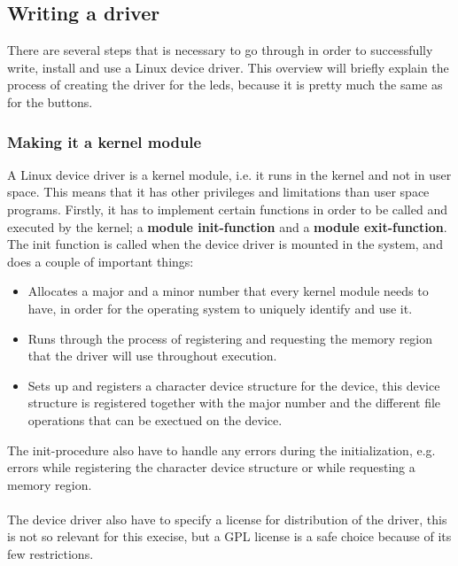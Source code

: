 \subsection{Writing a driver}
There are several steps that is necessary to go through in order
to successfully write, install and use a Linux device driver. This
overview will briefly explain the process of creating the driver
for the leds, because it is pretty much the same as for the buttons.

\subsubsection{Making it a kernel module}
A Linux device driver is a kernel module, i.e. it runs in the kernel and
not in user space. This means that it has other privileges and
limitations than user space programs. Firstly, it has to implement
certain functions in order to be called and executed by the kernel;
a \textbf{module init-function} and a \textbf{module exit-function}.
The init function is called when the device driver is mounted in the
system, and does a couple of important things:

\begin{itemize}
	\item	Allocates a major and a minor number that every
			kernel module needs to have, in order for the
			operating system to uniquely identify and use it.
	\item	Runs through the process of registering and
			requesting the memory region
			that the driver will use throughout execution.
	\item	Sets up and registers a character device structure
			for the device, this device structure is registered
			together with the major number and the different
			file operations that can be exectued on the device.
\end{itemize}
The init-procedure also have to handle any errors during the
initialization, e.g. errors while registering the
character device structure or while requesting a memory region.\\
\\
The device driver also have to specify a license for distribution of
the driver, this is not so relevant for this execise, but a GPL license
is a safe choice because of its few restrictions.

